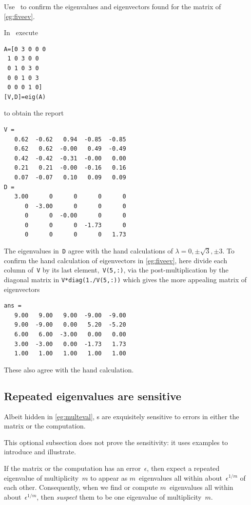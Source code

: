\begin{example} \label{eg:fiveevm}
Use \script\ to confirm the eigenvalues and eigenvectors found for the matrix of \autoref{eg:fiveev}.
\begin{solution} 
In \script\ execute
\begin{verbatim}
A=[0 3 0 0 0
 1 0 3 0 0
 0 1 0 3 0
 0 0 1 0 3
 0 0 0 1 0]
[V,D]=eig(A)
\end{verbatim}
\setbox\ajrqrbox\hbox{}%
\marginpar{\usebox{\ajrqrbox}}%
to obtain the report \twodp
\begin{verbatim}
V =
   0.62  -0.62   0.94  -0.85  -0.85
   0.62   0.62  -0.00   0.49  -0.49
   0.42  -0.42  -0.31  -0.00   0.00
   0.21   0.21  -0.00  -0.16   0.16
   0.07  -0.07   0.10   0.09   0.09
D =
   3.00      0      0      0      0
      0  -3.00      0      0      0
      0      0  -0.00      0      0
      0      0      0  -1.73      0
      0      0      0      0   1.73
\end{verbatim}
The eigenvalues in~\verb|D| agree with the hand calculations of \(\lambda=0,\pm\sqrt3,\pm3\).
To confirm the hand calculation of eigenvectors in \autoref{eg:fiveev}, here divide each column of~\verb|V| by its last element,~\verb|V(5,:)|, via the post-multiplication by the diagonal matrix in \verb|V*diag(1./V(5,:))| which gives the more appealing matrix of eigenvectors \twodp
\begin{verbatim}
ans =
   9.00   9.00   9.00  -9.00  -9.00
   9.00  -9.00   0.00   5.20  -5.20
   6.00   6.00  -3.00   0.00   0.00
   3.00  -3.00   0.00  -1.73   1.73
   1.00   1.00   1.00   1.00   1.00
\end{verbatim}
These also agree with the hand calculation.
\end{solution}
\end{example}







\subsection{Repeated eigenvalues are sensitive}
\label{sec:reas}



Albeit hidden in \autoref{eg:multeval}, s are exquisitely sensitive to errors in either the matrix or the computation.
\begin{aside}
This optional subsection does not prove the sensitivity: it uses examples to introduce and illustrate.
\end{aside}
If the matrix or the computation has an error~\(\epsilon\)\index{\(\epsilon\)}, then expect a repeated eigenvalue of multiplicity~\(m\) to appear as \(m\)~eigenvalues all within about~\(\epsilon^{1/m}\) of each other.
Consequently, when we find or compute \(m\)~eigenvalues all within about~\(\epsilon^{1/m}\), then \emph{suspect} them to be one eigenvalue of multiplicity~\(m\).

